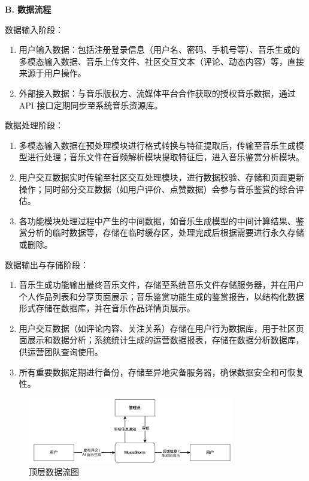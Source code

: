 \documentclass{base}
\numberwithin{figure}{section} %
\begin{document}
\textbf{B. 数据流程}

数据输入阶段：

\begin{enumerate}
    \item 用户输入数据：包括注册登录信息（用户名、密码、手机号等）、音乐生成的多模态输入数据、音乐上传文件、社区交互文本（评论、动态内容）等，直接来源于用户操作。​
    \item 外部接入数据：与音乐版权方、流媒体平台合作获取的授权音乐数据，通过 API 接口定期同步至系统音乐资源库。
\end{enumerate}

数据处理阶段：

\begin{enumerate}
    \item 多模态输入数据在预处理模块进行格式转换与特征提取后，传输至音乐生成模型进行处理；音乐文件在音频解析模块提取特征后，进入音乐鉴赏分析模块。​
    \item 用户交互数据实时传输至社区交互处理模块，进行数据校验、存储和页面更新操作；同时部分交互数据（如用户评价、点赞数据）会参与音乐鉴赏的综合评估。​
    \item 各功能模块处理过程中产生的中间数据，如音乐生成模型的中间计算结果、鉴赏分析的临时数据等，存储在临时缓存区，处理完成后根据需要进行永久存储或删除。
\end{enumerate}

数据输出与存储阶段：

\begin{enumerate}
    \item 音乐生成功能输出最终音乐文件，存储至系统音乐文件存储服务器，并在用户个人作品列表和分享页面展示；音乐鉴赏功能生成的鉴赏报告，以结构化数据形式存储在数据库，并在音乐作品详情页展示。
    \item 用户交互数据（如评论内容、关注关系）存储在用户行为数据库，用于社区页面展示和数据分析；系统统计生成的运营数据报表，存储在数据分析数据库，供运营团队查询使用。​
    \item 所有重要数据定期进行备份，存储至异地灾备服务器，确保数据安全和可恢复性。
\end{enumerate}

\begin{figure}[H]
    \centering
    \includegraphics[width=0.8\textwidth]{images/1-1.png}
    \caption{顶层数据流图}
\end{figure}
\end{document}
